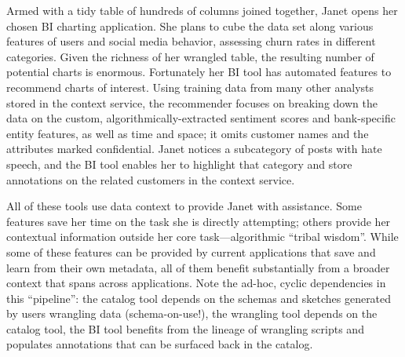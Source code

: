 \documentclass{sig-alternate}
\begin{document}
Armed with a tidy table of hundreds of columns joined together, Janet opens her chosen BI charting application. She plans to cube the data set along various features of users and social media behavior, assessing churn rates in different categories. Given the richness of her wrangled table, the resulting number of potential charts is enormous. Fortunately her BI tool has automated features to recommend charts of interest. Using training data from many other analysts stored in the context service, the recommender focuses on breaking down the data on the custom, algorithmically-extracted sentiment scores and bank-specific entity features, as well as time and space; it omits customer names and the attributes marked confidential.  Janet notices a subcategory of posts with hate speech, and the BI tool enables her to highlight that category and store annotations on the related customers in the context service.

All of these tools use data context to provide Janet with assistance. Some features save her time on the task she is directly attempting; others provide her contextual information outside her core task---algorithmic ``tribal wisdom''. While some of these features can be provided by current applications that save and learn from their own metadata, all of them benefit substantially from a broader context that spans across applications. Note the ad-hoc, cyclic dependencies in this ``pipeline'': the catalog tool depends on the schemas and sketches generated by users wrangling data (schema-on-use!), the wrangling tool depends on the catalog tool, the BI tool benefits from the lineage of wrangling scripts and populates annotations that can be surfaced back in the catalog.
\end{document}
